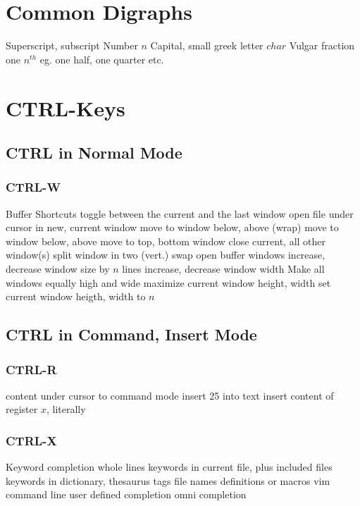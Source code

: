 \section{Common Digraphs}	{}
	{Superscript, subscript Number $n$}
	{Capital, small greek letter $char$}
	{Vulgar fraction one $n^{th}$ eg. one half, one quarter etc.}

\vfil \break
\section{CTRL-Keys}	{}
\subsection{CTRL in Normal Mode}	{}
\subsubsection{CTRL-W}{Buffer Shortcuts}
\cmdS{\ctrl \^{} }	{toggle between the current and the last window}
	{open file under cursor in new, current window}
	{move to window below, above (wrap)}
	{move to window below, above}
	{move to top, bottom window}
	{close current, all other window(s)}
	{split window in two (vert.)}
	{swap open buffer windows }
	{increase, decrease window size by $n$ lines}
	{increase, decrease window width}
	{Make all windows equally high and wide}
	{maximize current window height, width}
	{set current window heigth, width to $n$ }

\subsection{CTRL in Command, Insert Mode}	{}
\subsubsection{CTRL-R}{}
	{content under cursor to command mode}
	{insert 25 into text}
	{insert content of register $x$, literally}

\subsubsection{CTRL-X}{Keyword completion}
	{whole lines}
	{keywords in current file, plus included files}
	{keywords in dictionary, thesaurus}
\cmdS{\ctrl{}X\ctrl{}]}	{tags}
	{file names}
	{definitions or macros}
	{vim command line}
	{user defined completion}
	{omni completion}

